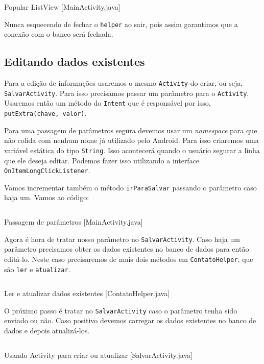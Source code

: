 \begin{listing}[H]
  \inputminted[linenos=true,frame=bottomline,tabsize=3]{ java }{ source/MainActivity-6.java }
  \caption{Popular ListView [MainActivity.java]}
\end{listing}

Nunca esquecendo de fechar o \texttt{helper} ao sair, pois assim garantimos que a conexão com
o banco será fechada.

\subsection{Editando dados existentes}

Para a edição de informações usaremos o mesmo \texttt{Activity} do criar, ou seja, \texttt{SalvarActivity}.
Para isso precisamos passar um parâmetro para o \texttt{Activity}. Usaremos então um método do
\texttt{Intent} que é responsável por isso, \texttt{putExtra(chave, valor)}.

Para uma passagem de parâmetros segura devemos usar um \textit{namespace} para que não colida com
nenhum nome já utilizado pelo Android. Para isso criaremos uma variável estática do tipo \texttt{String}.
Isso acontecerá quando o usuário segurar a linha que ele deseja editar. Podemos fazer isso utilizando
a interface \texttt{OnItemLongClickListener}.

Vamos incrementar também o método \texttt{irParaSalvar} passando o parâmetro caso haja um. Vamos ao
código:

\begin{listing}[H]
  \inputminted[linenos=true,frame=bottomline,tabsize=3]{ java }{ source/MainActivity-7.java }
  \caption{Passagem de parâmetros [MainActivity.java]}
\end{listing}

Agora é hora de tratar nosso parâmetro no \texttt{SalvarActivity}. Caso haja um parâmetro precisamos
obter os dados existentes no banco de dados para então editá-lo. Neste caso precisaremos de mais dois
métodos em \texttt{ContatoHelper}, que são \texttt{ler} e \texttt{atualizar}.

\begin{listing}[H]
  \inputminted[linenos=true,frame=bottomline,tabsize=3]{ java }{ source/ContatoHelper-4.java }
  \caption{Ler e atualizar dados existentes [ContatoHelper.java]}
\end{listing}

O próximo passo é tratar no \texttt{SalvarActivity} caso o parâmetro tenha sido enviado ou não. Caso positivo
devemos carregar os dados existentes no banco de dados e depois atualizá-los.

\begin{listing}[H]
  \inputminted[linenos=true,frame=bottomline,tabsize=3]{ java }{ source/SalvarActivity-3.java }
  \caption{Usando Activity para criar ou atualizar [SalvarActivity.java]}
\end{listing}